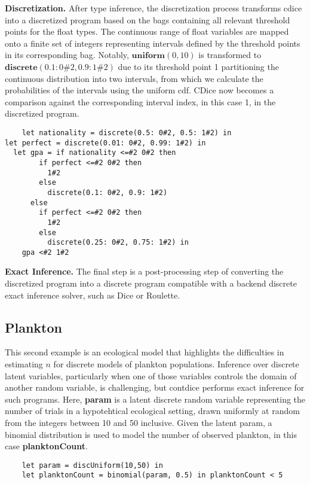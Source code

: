 \documentclass[acmsmall,screen,dvipsnames,x11names,nonacm,anonymous,review]{acmart}
\begin{document}
\textbf{Discretization.} After type inference, the discretization process transforms cdice into a discretized program based on the bags containing all relevant threshold points for the float types. The continuous range of float variables are mapped onto a finite set of integers representing intervals defined by the threshold points in its corresponding bag. Notably, $\textbf{uniform}(0,10)$ is transformed to $\textbf{discrete}(0.1: 0\#2, 0.9: 1\#2)$ due to its threshold point 1 partitioning the continuous distribution into two intervals, from which we calculate the probabilities of the intervals using the uniform cdf. CDice now becomes a comparison against the corresponding interval index, in this case 1, in the discretized program.

\begin{lstlisting}
    let nationality = discrete(0.5: 0#2, 0.5: 1#2) in
let perfect = discrete(0.01: 0#2, 0.99: 1#2) in
  let gpa = if nationality <=#2 0#2 then
        if perfect <=#2 0#2 then
          1#2
        else
          discrete(0.1: 0#2, 0.9: 1#2)
      else
        if perfect <=#2 0#2 then
          1#2
        else
          discrete(0.25: 0#2, 0.75: 1#2) in
    gpa <#2 1#2
\end{lstlisting}


\textbf{Exact Inference.} The final step is a post-processing step of converting the discretized program into a discrete program compatible with a backend discrete exact inference solver, such as Dice or Roulette.

\subsection{Plankton}
This second example is an ecological model that highlights the difficulties in estimating $n$ for discrete models of plankton populations. Inference over discrete latent variables, particularly when one of those variables controls the domain of another random variable, is challenging, but contdice performs exact inference for such programs. Here, \textbf{param} is a latent discrete random variable representing the number of trials in a hypotehtical ecological setting, drawn uniformly at random from the integers between 10 and 50 inclusive. Given the latent param, a binomial distribution is used to model the number of observed plankton, in this case \textbf{planktonCount}.

\begin{lstlisting}
    let param = discUniform(10,50) in
    let planktonCount = binomial(param, 0.5) in planktonCount < 5
\end{lstlisting}
\end{document}
